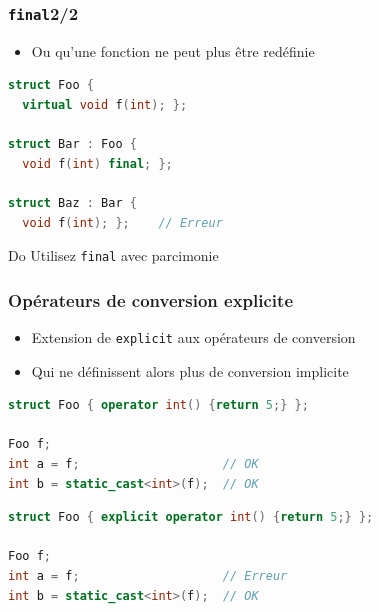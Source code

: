 \documentclass[C++.tex]{subfiles}
\begin{document}
\begin{frame}[fragile]
	\frametitle{\lstinline|final|\titlehfill{}2/2}
	\begin{itemize}
		\item Ou qu'une fonction ne peut plus être redéfinie
	\end{itemize}

	\begin{lstlisting}[language=C++]
struct Foo {
  virtual void f(int); };

struct Bar : Foo {
  void f(int) final; };

struct Baz : Bar {
  void f(int); };    // Erreur\end{lstlisting}

	\begin{exampleblock}{Do}
		Utilisez \lstinline|final| avec parcimonie

	\end{exampleblock}
\end{frame}

\begin{frame}[fragile]
	\frametitle{Opérateurs de conversion explicite}
	\begin{itemize}
		\item Extension de \lstinline|explicit| aux opérateurs de conversion
		\item Qui ne définissent alors plus de conversion implicite
	\end{itemize}

	\begin{lstlisting}[language=C++]
struct Foo { operator int() {return 5;} };

Foo f;
int a = f;	                  // OK
int b = static_cast<int>(f);  // OK\end{lstlisting}

	\begin{lstlisting}[language=C++]
struct Foo { explicit operator int() {return 5;} };

Foo f;
int a = f;	                  // Erreur
int b = static_cast<int>(f);  // OK\end{lstlisting}
\end{frame}
\end{document}

